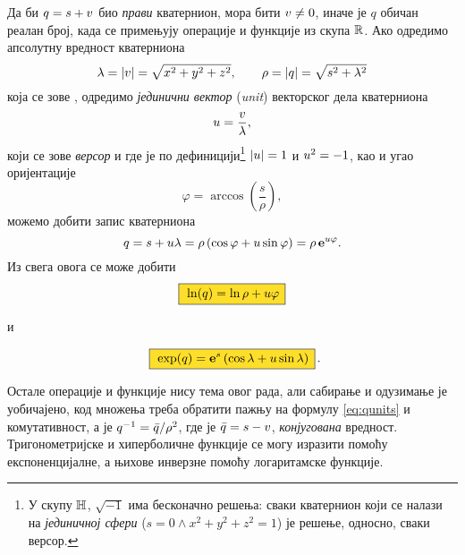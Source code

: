 Да би $q=s+{v}$ био {\sl прави\/} кватернион, мора бити ${v}\ne0$, иначе је $q$ обичан реалан број,
када се примењују операције и функције из скупа ${\mathbb R}$.
Ако одредимо апсолутну вредност кватерниона
$$
\lambda = {\vert{v}\vert} = \sqrt{\mathstrut x^2+y^2+z^2},\qquad
\rho = {\vert q\vert} = \sqrt{\mathstrut s^2+\lambda^2}
$$
која се зове {\sl {}\/}, одредимо
{\sl јединични вектор\/} ({\sl unit\/}) векторског дела кватерниона
$$
{u} = \frac {{v}}\lambda, 
$$
који се зове {\sl версор\/}
и где је по дефиницији\footnote{У 
скупу ${\mathbb H}$, $\sqrt{-1}$ има бесконачно решења:
сваки кватернион који се налази на {\sl јединичној сфери\/}
($s=0\land x^2+y^2+z^2=1$) је решење, односно, сваки версор.} 
${\vert{u}\vert}=1$ и  ${u}^2=-1$,
као и угао оријентације
$$
\varphi = \arccos\left( \frac s\rho \right),
$$
можемо добити запис кватерниона
\begin{equation}
q
= s + {u}\lambda
=\rho\,(\cos\varphi + {u}\sin\varphi)
=\rho\,{\bf e}^{{u}\varphi}.
\end{equation}
Из свега овога се може добити
\begin{equation}\index{ln@$\ln$}
    \okvir{\ln(q)  = \ln\rho + \uv\varphi}
\end{equation}
\centerline{и}
\begin{equation}\index{exp@$\exp$}
    \okvir{\exp(q) = \e^s \left( \cos\lambda + \uv\sin\lambda \right)}\rlap{.}
\end{equation}

\medskip

\danger
Остале операције и функције нису тема овог рада, али сабирање и одузимање
је уобичајено, код множења треба обратити пажњу на формулу \eqref{eq:qunits} и
комутативност, а  је
$q^{-1}={\bar q}/\rho^2$, где је ${\bar q}=s-{v}$, {\sl конјугована\/} вредност. 
Тригонометријске и хиперболичне функције се могу изразити помоћу експоненцијалне,
а њихове инверзне помоћу логаритамске функције.

